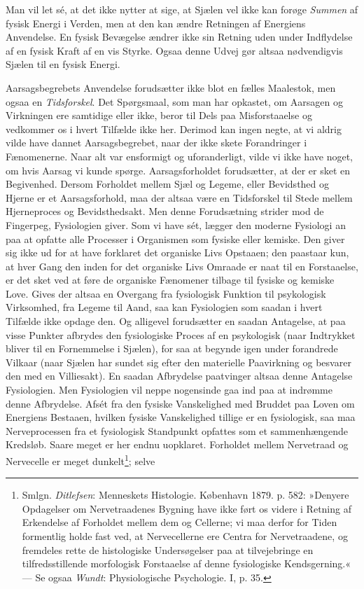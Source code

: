 \documentclass[12pt,a4paper,openany]{book}
\newcommand{\opage}[1]{\marginnote{\footnotesize\textit{[#1]}}}
\begin{document}
Man vil let sé, at det ikke nytter at sige, at Sjælen vel ikke kan
forøge \emph{Summen} af fysisk Energi i Verden, men at den kan ændre
Retningen af Energiens Anvendelse. En fysisk Bevægelse ændrer ikke sin
Retning uden under Indflydelse af en fysisk Kraft af en vis Styrke.
Ogsaa denne Udvej gør altsaa nødvendigvis Sjælen til en fysisk Energi.

Aarsagsbegrebets Anvendelse forudsætter ikke blot en fælles Maalestok,
men ogsaa en \emph{Tidsforskel}. Det Spørgsmaal, som man har opkastet,
om Aarsagen og Virkningen ere samtidige eller ikke, beror til Dels paa
Misforstaaelse og vedkommer os i hvert Tilfælde ikke her. Derimod kan
ingen negte, at vi aldrig vilde have dannet Aarsagsbegrebet, naar der
ikke skete Forandringer i Fænomenerne. Naar alt var ensformigt og
uforanderligt, vilde vi ikke have noget, om hvis Aarsag vi kunde spørge.
Aarsagsforholdet forudsætter, at der er sket en Begivenhed. Dersom
Forholdet mellem Sjæl og Legeme, eller Bevidsthed og Hjerne er et
Aarsagsforhold, maa der altsaa være en Tidsforskel til Stede mellem
Hjerneproces og Bevidsthedsakt. Men denne Forudsætning strider mod de
Fingerpeg, Fysiologien giver. Som vi have sét, lægger den
\opage{69}moderne Fysiologi an paa at opfatte alle Processer i
Organismen som fysiske eller kemiske. Den giver sig ikke ud for at have
forklaret det organiske Livs Opstaaen; den paastaar kun, at hver Gang
den inden for det organiske Livs Omraade er naat til en Forstaaelse, er
det sket ved at føre de organiske Fænomener tilbage til fysiske og
kemiske Love. Gives der altsaa en Overgang fra fysiologisk Funktion til
psykologisk Virksomhed, fra Legeme til Aand, saa kan Fysiologien som
saadan i hvert Tilfælde ikke opdage den. Og alligevel forudsætter en
saadan Antagelse, at paa visse Punkter afbrydes den fysiologiske Proces
af en psykologisk (naar Indtrykket bliver til en Fornemmelse i Sjælen),
for saa at begynde igen under forandrede Vilkaar (naar Sjælen har sundet
sig efter den materielle Paavirkning og besvarer den med en Villiesakt).
En saadan Afbrydelse paatvinger altsaa denne Antagelse Fysiologien. Men
Fysiologien vil neppe nogensinde gaa ind paa at indrømme denne
Afbrydelse. Afsét fra den fysiske Vanskelighed med Bruddet paa Loven om
Energiens Bestaaen, hvilken fysiske Vanskelighed tillige er en
fysiologisk, saa maa Nerveprocessen fra et fysiologisk Standpunkt
opfattes som et sammenhængende Kredsløb. Saare meget er her endnu
uopklaret. Forholdet mellem Nervetraad og Nervecelle er meget
dunkelt\footnote[1]{Smlgn. \emph{Ditlefsen}: Menneskets Histologie.
København 1879. p. 582: »Denyere Opdagelser om Nervetraadenes Bygning
have ikke ført os videre i Retning af Erkendelse af Forholdet mellem dem
og Cellerne; vi maa derfor for Tiden formentlig holde fast ved, at
Nervecellerne ere Centra for Nervetraadene, og fremdeles rette de
histologiske Undersøgelser paa at tilvejebringe en tilfredsstillende
morfologisk Forstaaelse af denne fysiologiske Kendsgerning.« --- Se
ogsaa \emph{Wundt}: Physiologische Psychologie. I, p. 35.}; selve
\end{document}
